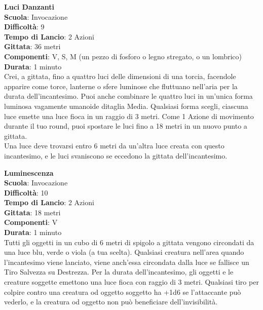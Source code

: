 \begin{multicols}{2}
\medskip\textbf{Luci Danzanti}\\
\textbf{Scuola}: Invocazione\\
\textbf{Difficoltà}:  9\\
\textbf{Tempo di Lancio}: 2 Azioni\\
\textbf{Gittata}: 36 metri\\
\textbf{Componenti}: V, S, M (un pezzo di fosforo o legno stregato, o un lombrico)\\
\textbf{Durata}: 1 minuto\\
Crei, a gittata, fino a quattro luci delle dimensioni di una torcia, facendole apparire come torce, lanterne o sfere luminose che fluttuano nell'aria per la durata dell'incantesimo. Puoi anche combinare le quattro luci in un'unica forma luminosa vagamente umanoide ditaglia Media. Qualsiasi  forma scegli, ciascuna luce emette una luce fioca in un raggio di 3 metri. Come 1 Azione di movimento durante il tuo round, puoi spostare le luci fino a 18 metri in un nuovo punto a gittata.\\
Una  luce deve trovarsi entro 6 metri da un'altra luce creata con questo incantesimo, e le luci svaniscono se eccedono la gittata dell'incantesimo. 

\medskip\textbf{Luminescenza}\\
\textbf{Scuola}: Invocazione\\
\textbf{Difficoltà}:  10\\
\textbf{Tempo di Lancio}: 2 Azioni\\
\textbf{Gittata}: 18 metri\\
\textbf{Componenti}: V\\
\textbf{Durata}: 1 minuto \\
Tutti gli oggetti in un cubo di 6 metri di spigolo a gittata vengono circondati da una luce blu,  verde o viola (a tua scelta). Qualsiasi creatura nell'area quando l'incantesimo viene lanciato, viene anch’essa circondata dalla luce se fallisce un Tiro Salvezza su Destrezza. Per la durata dell'incantesimo, gli oggetti e le creature soggette emettono una luce fioca con raggio di 3 metri. Qualsiasi tiro per colpire contro una creatura od oggetto soggetto ha +1d6 se l’attaccante può vederlo, e la creatura od oggetto non può beneficiare dell'invisibilità.


\end{multicols}
